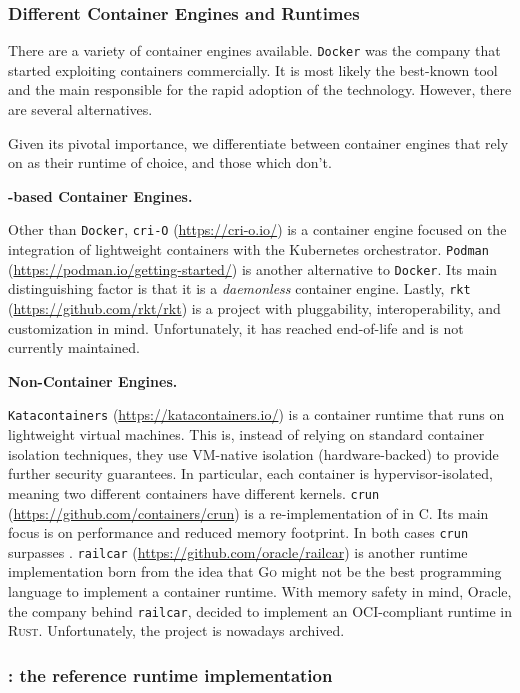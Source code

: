 \subsubsection*{Different Container Engines and Runtimes}

There are a variety of container engines available.
\texttt{Docker} was the company that started exploiting containers commercially.
It is most likely the best-known tool and the main responsible for the rapid adoption of the technology.
However, there are several alternatives.

Given its pivotal importance, we differentiate between container engines that rely on \runc as their runtime of choice, and those which don't.

\textbf{\runc-based Container Engines.}

Other than \texttt{Docker}, \texttt{cri-O} (\url{https://cri-o.io/}) is a container engine focused on the integration of lightweight containers with the Kubernetes orchestrator.
\texttt{Podman} (\url{https://podman.io/getting-started/}) is another alternative to \texttt{Docker}.
Its main distinguishing factor is that it is a \textit{daemonless} container engine.
Lastly, \texttt{rkt} (\url{https://github.com/rkt/rkt}) is a project with pluggability, interoperability, and customization in mind.
Unfortunately, it has reached end-of-life and is not currently maintained.

\textbf{Non-\runc Container Engines.}

\texttt{Katacontainers} (\url{https://katacontainers.io/}) is a container runtime that runs on lightweight virtual machines.
This is, instead of relying on standard container isolation techniques, they use VM-native isolation (hardware-backed) to provide further security guarantees.
In particular, each container is hypervisor-isolated, meaning two different containers have different kernels.
\texttt{crun} (\url{https://github.com/containers/crun}) is a re-implementation of \runc in C.
Its main focus is on performance and reduced memory footprint.
In both cases \texttt{crun} surpasses \runc.
\texttt{railcar} (\url{https://github.com/oracle/railcar}) is another runtime implementation born from the idea that \textsc{Go} might not be the best programming language to implement a container runtime.
With memory safety in mind, Oracle, the company behind \texttt{railcar}, decided to implement an OCI-compliant runtime in \textsc{Rust}.
Unfortunately, the project is nowadays archived.

\subsubsection*{\runc: the reference runtime implementation}


